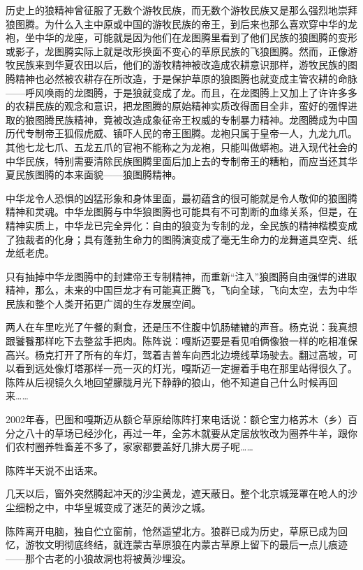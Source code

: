 \par 历史上的狼精神曾征服了无数个游牧民族，而无数个游牧民族又是那么强烈地崇拜狼图腾。为什么入主中原或中国的游牧民族的帝王，到后来也那么喜欢穿中华的龙袍，坐中华的龙座，可能就是因为他们在龙图腾里看到了他们民族的狼图腾的变形或影子，龙图腾实际上就是改形换面不变心的草原民族的飞狼图腾。然而，正像游牧民族来到华夏农田以后，他们的游牧精神被改造成农耕意识那样，游牧民族的图腾精神也必然被农耕存在所改造，于是保护草原的狼图腾也就变成主管农耕的命脉——呼风唤雨的龙图腾，于是狼就变成了龙。而且，在龙图腾上又加上了许许多多的农耕民族的观念和意识，把龙图腾的原始精神实质改得面目全非，蛮好的强悍进取的狼图腾民族精神，竟被改造成象征帝王权威的专制暴力精神。龙图腾成为中国历代专制帝王狐假虎威、镇吓人民的帝王图腾。龙袍只属于皇帝一人，九龙九爪。其他七龙七爪、五龙五爪的官袍不能称之为龙袍，只能叫做蟒袍。进入现代社会的中华民族，特别需要清除民族图腾里面后加上去的专制帝王的糟粕，而应当还其华夏民族图腾的本来面貌——狼图腾精神。
\par 中华龙令人恐惧的凶猛形象和身体里面，最初蕴含的很可能就是令人敬仰的狼图腾精神和灵魂。中华龙图腾与中华狼图腾也可能具有不可割断的血缘关系，但是，在精神实质上，中华龙已完全异化：自由的狼变为专制的龙，全民族的精神楷模变成了独裁者的化身；具有蓬勃生命力的图腾演变成了毫无生命力的龙舞道具空壳、纸龙纸老虎。
\par 只有抽掉中华龙图腾中的封建帝王专制精神，而重新“注入”狼图腾自由强悍的进取精神，那么，未来的中国巨龙才有可能真正腾飞，飞向全球，飞向太空，去为中华民族和整个人类开拓更广阔的生存发展空间。
\par 
\par 两人在车里吃光了午餐的剩食，还是压不住腹中饥肠辘辘的声音。杨克说：我真想跟饕餮那样吃下去整盆手把肉。陈阵说：嘎斯迈要是看见咱俩像狼一样的吃相准保高兴。杨克打开了所有的车灯，驾着吉普车向西北边境线草场驶去。翻过高坡，可以看到远处像灯塔那样一亮一灭的灯光，嘎斯迈一定握着手电在那里站得很久了。陈阵从后视镜久久地回望朦胧月光下静静的狼山，他不知道自己什么时候再回来……
\par 2002年春，巴图和嘎斯迈从额仑草原给陈阵打来电话说：额仑宝力格苏木（乡）百分之八十的草场已经沙化，再过一年，全苏木就要从定居放牧改为圈养牛羊，跟你们农村圈养牲畜差不多了，家家都要盖好几排大房子呢……
\par 陈阵半天说不出话来。
\par 几天以后，窗外突然腾起冲天的沙尘黄龙，遮天蔽日。整个北京城笼罩在呛人的沙尘细粉之中，中华皇城变成了迷茫的黄沙之城。
\par 陈阵离开电脑，独自伫立窗前，怆然遥望北方。狼群已成为历史，草原已成为回忆，游牧文明彻底终结，就连蒙古草原狼在内蒙古草原上留下的最后一点儿痕迹——那个古老的小狼故洞也将被黄沙埋没。
